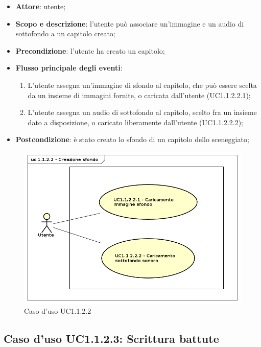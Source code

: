 \begin{itemize}
\item \textbf{Attore}: utente;
\item \textbf{Scopo e descrizione}: l'utente può associare un'immagine e un audio di sottofondo a un capitolo creato;
\item \textbf{Precondizione}: l'utente ha creato un capitolo;
\item \textbf{Flusso principale degli eventi}:
\begin{enumerate}
\item L'utente assegna un'immagine di sfondo al capitolo, che può essere scelta da un insieme di immagini fornite, o caricata dall'utente (UC1.1.2.2.1);
\item L'utente assegna un audio di sottofondo al capitolo, scelto fra un insieme dato a disposizione, o caricato liberamente dall'utente (UC1.1.2.2.2);
\end{enumerate} 
\item \textbf{Postcondizione}: è stato creato lo sfondo di un capitolo dello sceneggiato;
\end{itemize}
\begin{figure}[htbp]
\centering
\includegraphics[scale=0.5]{immagini/uc1_1_2_2_creazione_sfondo.png}
\captionsetup{labelfont=bf}
\caption{Caso d'uso UC1.1.2.2}
\end{figure}
\newpage

\subsection{Caso d'uso UC1.1.2.3: Scrittura battute}
\label{sec:UC1.1.2.3}

